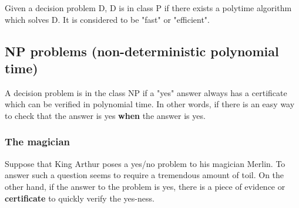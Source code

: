 \documentclass[9pt, letterpaper, oneside]{article}
\begin{document}
Given a decision problem D, D is in class P if there exists a polytime algorithm which solves D. It is considered to be "fast" or "efficient".

\subsection{NP problems (non-deterministic polynomial time)}

A decision problem is in the class NP if a "yes" answer always has a certificate which can be verified in polynomial time. In other words, if there is an easy way to check that the answer is yes \textbf{when} the answer is yes.

\subsubsection{The magician}

Suppose that King Arthur poses a yes/no problem to his magician Merlin. To answer such a question seems to require a tremendous amount of toil. On the other hand, if the answer to the problem is yes, there is a piece of evidence or \textbf{certificate} to quickly verify the yes-ness.
\end{document}
